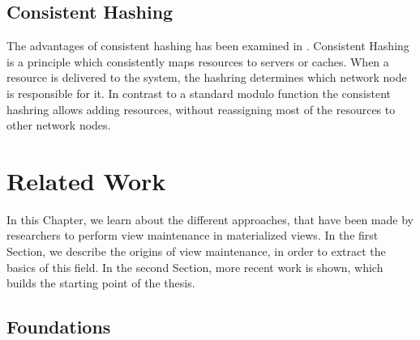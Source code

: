\documentclass[11pt,a4paper,bibtotoc,idxtotoc,headsepline,footsepline,footexclude,BCOR12mm,DIV13]{scrbook}
\begin{document}
\section{Consistent Hashing}

The advantages of consistent hashing has been examined in \cite{karger:webcaching}. Consistent Hashing is a principle which consistently maps resources to servers or caches. When a resource is delivered to the system, the hashring determines which network node is responsible for it. In contrast to a standard modulo function the consistent hashring allows adding resources, without reassigning most of the resources to other network nodes. 





\chapter{Related Work}
\label{chap:relatedwork}

In this Chapter, we learn about the different approaches, that have been made by researchers to perform view maintenance in materialized views. In the first Section, we describe the origins of view maintenance, in order to extract the basics of this field. In the second Section, more recent work is shown, which builds the starting point of the thesis.

\section{Foundations}
\end{document}
